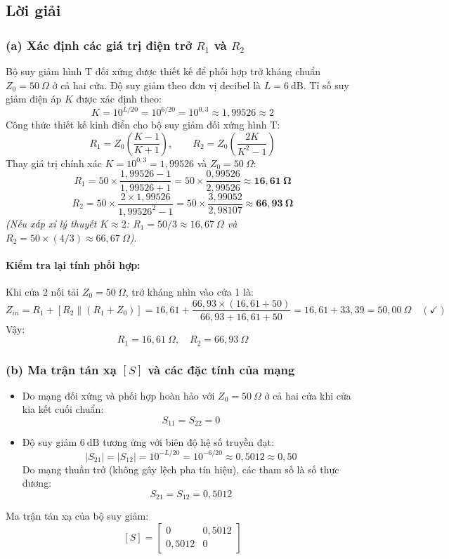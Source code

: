 \documentclass[12pt,a4paper]{article}
\begin{document}
\subsection{Lời giải}

\subsubsection{(a) Xác định các giá trị điện trở $R_1$ và $R_2$}
Bộ suy giảm hình T đối xứng được thiết kế để phối hợp trở kháng chuẩn $Z_0 = 50~\Omega$ ở cả hai cửa. Độ suy giảm theo đơn vị decibel là $L = 6~\text{dB}$.
Tỉ số suy giảm điện áp $K$ được xác định theo:
\[
K = 10^{L/20} = 10^{6/20} = 10^{0{,}3} \approx 1{,}99526 \approx 2
\]
Công thức thiết kế kinh điển cho bộ suy giảm đối xứng hình T:
\[
R_1 = Z_0 \left( \frac{K - 1}{K + 1} \right), \qquad R_2 = Z_0 \left( \frac{2K}{K^2 - 1} \right)
\]
Thay giá trị chính xác $K = 10^{0{,}3} = 1{,}99526$ và $Z_0 = 50~\Omega$:
\[
R_1 = 50 \times \frac{1{,}99526 - 1}{1{,}99526 + 1} = 50 \times \frac{0{,}99526}{2{,}99526} \approx \mathbf{16{,}61~\Omega}
\]
\[
R_2 = 50 \times \frac{2 \times 1{,}99526}{1{,}99526^2 - 1} = 50 \times \frac{3{,}99052}{2{,}98107} \approx \mathbf{66{,}93~\Omega}
\]
\textit{(Nếu xấp xỉ lý thuyết $K \approx 2$: $R_1 = 50/3 \approx 16{,}67~\Omega$ và $R_2 = 50 \times (4/3) \approx 66{,}67~\Omega$)}.

\paragraph{Kiểm tra lại tính phối hợp:} Khi cửa 2 nối tải $Z_0 = 50~\Omega$, trở kháng nhìn vào cửa 1 là:
\[
Z_{in} = R_1 + \left[ R_2 \parallel (R_1 + Z_0) \right] = 16{,}61 + \frac{66{,}93 \times (16{,}61 + 50)}{66{,}93 + 16{,}61 + 50} = 16{,}61 + 33{,}39 = 50{,}00~\Omega \quad (\checkmark)
\]
Vậy:
\[
\boxed{R_1 = 16{,}61~\Omega, \quad R_2 = 66{,}93~\Omega}
\]

\subsubsection{(b) Ma trận tán xạ $[S]$ và các đặc tính của mạng}
\begin{itemize}
    \item Do mạng đối xứng và phối hợp hoàn hảo với $Z_0 = 50~\Omega$ ở cả hai cửa khi cửa kia kết cuối chuẩn:
    \[
    S_{11} = S_{22} = 0
    \]
    \item Độ suy giảm $6~\text{dB}$ tương ứng với biên độ hệ số truyền đạt:
    \[
    |S_{21}| = |S_{12}| = 10^{-L/20} = 10^{-6/20} \approx 0{,}5012 \approx 0{,}50
    \]
    Do mạng thuần trở (không gây lệch pha tín hiệu), các tham số là số thực dương:
    \[
    S_{21} = S_{12} = 0{,}5012
    \]
\end{itemize}
Ma trận tán xạ của bộ suy giảm:
\[
\boxed{[S] = \begin{bmatrix} 0 & 0{,}5012 \\ 0{,}5012 & 0 \end{bmatrix}}
\]
\end{document}
